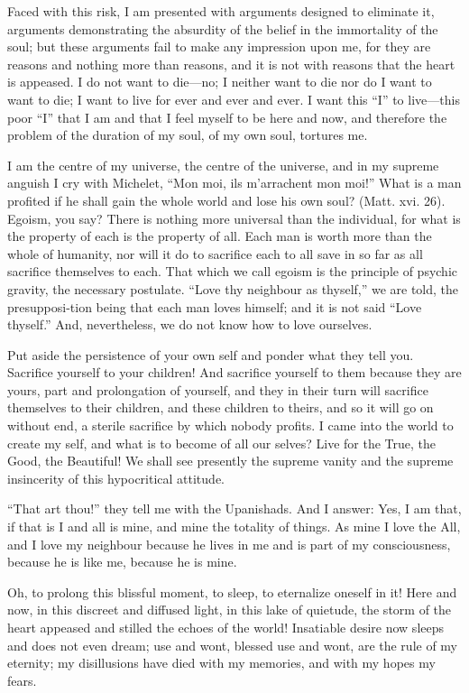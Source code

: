 Faced with this risk, I am presented with arguments designed to
eliminate it, arguments demonstrating the absurdity of the belief in
the immortality of the soul; but these arguments fail to make any
impression upon me, for they are reasons and nothing more than
reasons, and it is not with reasons that the heart is appeased. I do
not want to die---no; I neither want to die nor do I want to want to
die; I want to live for ever and ever and ever. I want this ``I'' to
live---this poor ``I'' that I am and that I feel myself to be here and
now, and therefore the problem of the duration of my soul, of my own
soul, tortures me.

I am the centre of my universe, the centre of the universe, and in my
supreme anguish I cry with Michelet, ``Mon moi, ils m'arrachent mon
moi!'' What is a man profited if he shall gain the whole world and
lose his own soul? (Matt. xvi. 26). Egoism, you say? There is nothing
more universal than the individual, for what is the property of each
is the property of all. Each man is worth more than the whole of
humanity, nor will it do to sacrifice each to all save in so far as
all sacrifice themselves to each. That which we call egoism is the
principle of psychic gravity, the necessary postulate. ``Love thy
neighbour as thyself,'' we are told, the presupposi-tion
being that each man loves himself; and it is not said ``Love
thyself.'' And, nevertheless, we do not know how to love ourselves.

Put aside the persistence of your own self and ponder what they tell
you. Sacrifice yourself to your children! And sacrifice yourself to
them because they are yours, part and prolongation of yourself, and
they in their turn will sacrifice themselves to their children, and
these children to theirs, and so it will go on without end, a sterile
sacrifice by which nobody profits. I came into the world to create my
self, and what is to become of all our selves? Live for the True, the
Good, the Beautiful! We shall see presently the supreme vanity and the
supreme insincerity of this hypocritical attitude.

``That art thou!'' they tell me with the Upanishads. And I answer:
Yes, I am that, if that is I and all is mine, and mine the totality of
things. As mine I love the All, and I love my neighbour because he
lives in me and is part of my consciousness, because he is like me,
because he is mine.

Oh, to prolong this blissful moment, to sleep, to eternalize oneself
in it! Here and now, in this discreet and diffused light, in this lake
of quietude, the storm of the heart appeased and stilled the echoes of
the world! Insatiable desire now sleeps and does not even dream; use
and wont, blessed use and wont, are the rule of my eternity; my
disillusions have died with my memories, and with my hopes my fears.


